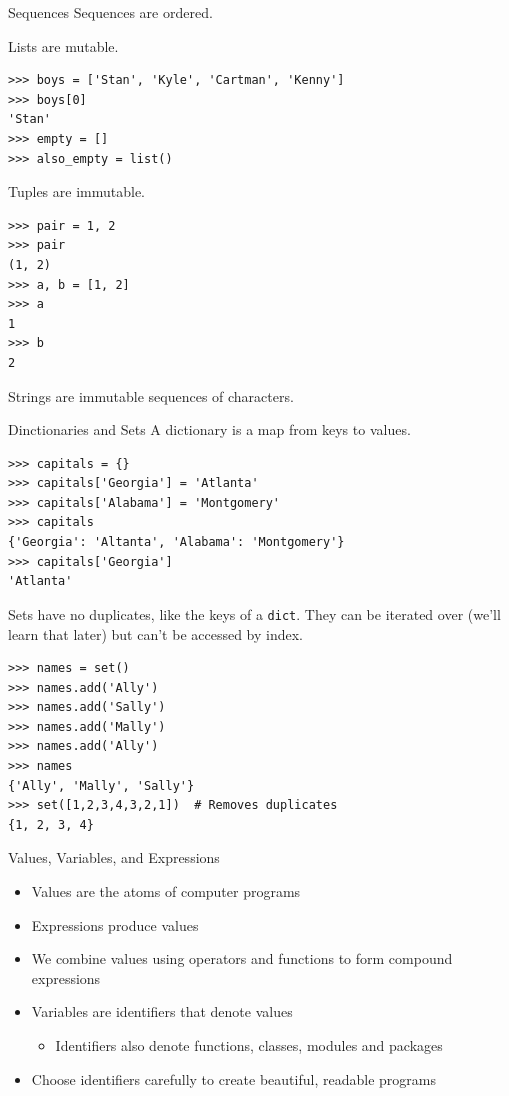 \documentclass[smaller, aspectratio=1610]{beamer}
\begin{document}
\begin{frame}[label={sec:org28acf75},fragile]{Sequences}
 Sequences are ordered.

Lists are mutable.

\lstset{language=Python,label= ,caption= ,captionpos=b,numbers=none}
\begin{lstlisting}
>>> boys = ['Stan', 'Kyle', 'Cartman', 'Kenny']
>>> boys[0]
'Stan'
>>> empty = []
>>> also_empty = list()
\end{lstlisting}

Tuples are immutable.

\lstset{language=Python,label= ,caption= ,captionpos=b,numbers=none}
\begin{lstlisting}
>>> pair = 1, 2
>>> pair
(1, 2)
>>> a, b = [1, 2]
>>> a
1
>>> b
2
\end{lstlisting}

Strings are immutable sequences of characters.
\end{frame}


\begin{frame}[label={sec:orgd251114},fragile]{Dinctionaries and Sets}
 A dictionary is a map from keys to values.

\lstset{language=Python,label= ,caption= ,captionpos=b,numbers=none}
\begin{lstlisting}
>>> capitals = {}
>>> capitals['Georgia'] = 'Atlanta'
>>> capitals['Alabama'] = 'Montgomery'
>>> capitals
{'Georgia': 'Altanta', 'Alabama': 'Montgomery'}
>>> capitals['Georgia']
'Atlanta'
\end{lstlisting}

Sets have no duplicates, like the keys of a \texttt{dict}. They can be iterated over (we'll learn that later) but can't be accessed by index.

\lstset{language=Python,label= ,caption= ,captionpos=b,numbers=none}
\begin{lstlisting}
>>> names = set()
>>> names.add('Ally')
>>> names.add('Sally')
>>> names.add('Mally')
>>> names.add('Ally')
>>> names
{'Ally', 'Mally', 'Sally'}
>>> set([1,2,3,4,3,2,1])  # Removes duplicates
{1, 2, 3, 4}
\end{lstlisting}
\end{frame}


\begin{frame}[label={sec:org8be3d1f}]{Values, Variables, and Expressions}
\begin{itemize}
\item Values are the atoms of computer programs
\item Expressions produce values
\item We combine values using operators and functions to form compound expressions
\item Variables are identifiers that denote values
\begin{itemize}
\item Identifiers also denote functions, classes, modules and packages
\end{itemize}
\item Choose identifiers carefully to create beautiful, readable programs
\end{itemize}
\end{frame}
\end{document}
